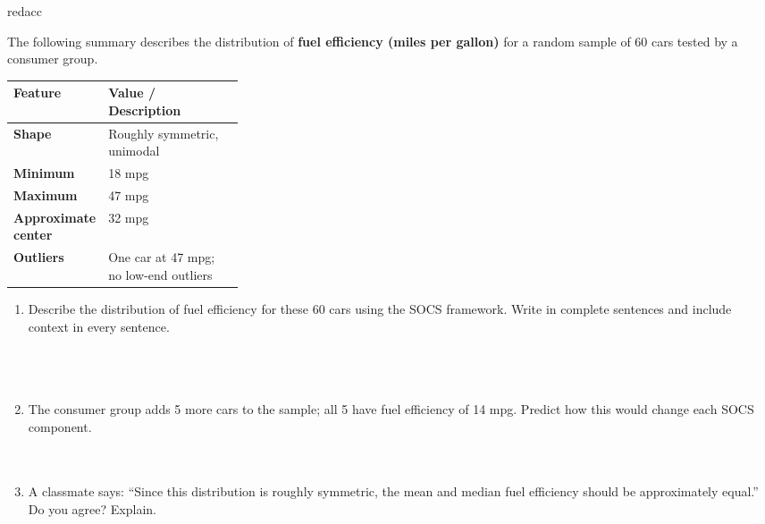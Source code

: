 \documentclass[10pt]{article}
\begin{document}
\vspace{0.14in}

\begin{blurbbox}{redacc}
\small

The following summary describes the distribution of \textbf{fuel efficiency
(miles per gallon)} for a random sample of 60 cars tested by a consumer group.

\vspace{8pt}
\renewcommand{\arraystretch}{1.5}
\begin{tabularx}{0.72\linewidth}{@{} >{\bfseries}p{0.30\linewidth}
                                      X @{}}
\rowcolor{sky}
\textbf{Feature} & \textbf{Value / Description} \\
\midrule
Shape & Roughly symmetric, unimodal \\
Minimum & 18 mpg \\
Maximum & 47 mpg \\
Approximate center & 32 mpg \\
Outliers & One car at 47 mpg; no low-end outliers \\
\end{tabularx}

\vspace{10pt}

\begin{enumerate}[leftmargin=1.5em, itemsep=10pt]

  \item Describe the distribution of fuel efficiency for these 60 cars using
        the SOCS framework. Write in complete sentences and include context in
        every sentence.\\[6pt]
        \writeline\\[1pt]\writeline\\[1pt]\writeline\\[1pt]\writeline

  \item The consumer group adds 5 more cars to the sample; all 5 have fuel
        efficiency of 14 mpg. Predict how this would change each SOCS component.\\[6pt]
        \writeline\\[1pt]\writeline\\[1pt]\writeline

  \item A classmate says: ``Since this distribution is roughly symmetric,
        the mean and median fuel efficiency should be approximately equal.''
        Do you agree? Explain.\\[6pt]
        \writeline\\[1pt]\writeline

\end{enumerate}

\end{blurbbox}
\end{document}
